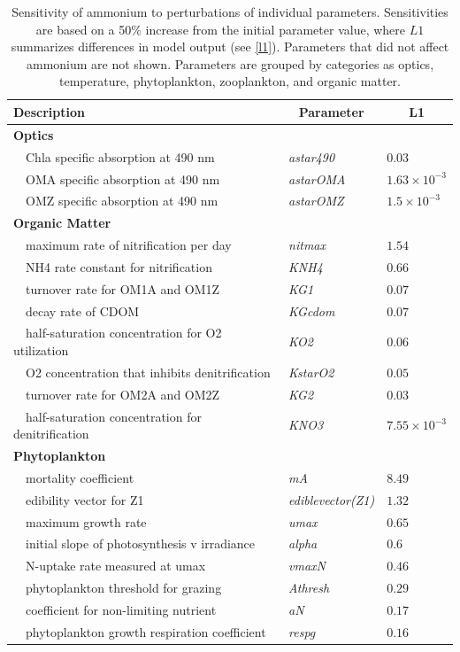 \documentclass[review]{elsarticle}\usepackage[]{graphicx}\usepackage[]{color}
\begin{document}
\begin{table}[!tbp]
{\footnotesize
\caption{Sensitivity of ammonium to perturbations of individual parameters.  Sensitivities are based on a 50\% increase from the initial parameter value, where $L1$ summarizes differences in model output (see \cref{l1}).  Parameters that did not affect ammonium are not shown.  Parameters are grouped by categories as optics, temperature, phytoplankton, zooplankton, and organic matter.\label{tab:nh4sens}} 
\begin{center}
\begin{tabular}{lll}
\hline\hline
\multicolumn{1}{l}{Description}&\multicolumn{1}{c}{Parameter}&\multicolumn{1}{c}{L1}\tabularnewline
\hline
{\bfseries Optics}&&\tabularnewline
~~Chla specific absorption at 490 nm&\textit{astar490}&$0.03$\tabularnewline
~~OMA specific absorption at 490 nm&\textit{astarOMA}&$1.63\times 10^{-3}$\tabularnewline
~~OMZ specific absorption at 490 nm&\textit{astarOMZ}&$1.5\times 10^{-3}$\tabularnewline
\hline
{\bfseries Organic Matter}&&\tabularnewline
~~maximum rate of nitrification per day&\textit{nitmax}&$1.54$\tabularnewline
~~NH4 rate constant for nitrification&\textit{KNH4}&$0.66$\tabularnewline
~~turnover rate for OM1A and OM1Z&\textit{KG1}&$0.07$\tabularnewline
~~decay rate of CDOM&\textit{KGcdom}&$0.07$\tabularnewline
~~half-saturation concentration for O2 utilization&\textit{KO2}&$0.06$\tabularnewline
~~O2 concentration that inhibits denitrification&\textit{KstarO2}&$0.05$\tabularnewline
~~turnover rate for OM2A and OM2Z&\textit{KG2}&$0.03$\tabularnewline
~~half-saturation concentration for denitrification&\textit{KNO3}&$7.55\times 10^{-3}$\tabularnewline
\hline
{\bfseries Phytoplankton}&&\tabularnewline
~~mortality coefficient&\textit{mA}&$8.49$\tabularnewline
~~edibility vector for Z1&\textit{ediblevector(Z1)}&$1.32$\tabularnewline
~~maximum growth rate&\textit{umax}&$0.65$\tabularnewline
~~initial slope of photosynthesis v irradiance&\textit{alpha}&$0.6$\tabularnewline
~~N-uptake rate measured at umax&\textit{vmaxN}&$0.46$\tabularnewline
~~phytoplankton threshold for grazing&\textit{Athresh}&$0.29$\tabularnewline
~~coefficient for non-limiting nutrient&\textit{aN}&$0.17$\tabularnewline
~~phytoplankton growth respiration coefficient&\textit{respg}&$0.16$\tabularnewline

\end{tabular}
\end{center}}
\end{table}
\end{document}
